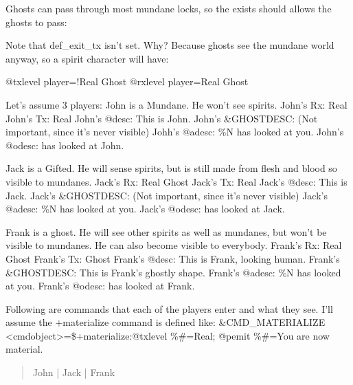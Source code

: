 \documentclass[letterpaper,10pt,english]{sphinxmanual}
\begin{document}
\begin{sphinxVerbatim}[commandchars=\\\{\}]
  
   
\end{sphinxVerbatim}

\sphinxAtStartPar
Ghosts can pass through most mundane locks, so the exists should allows the
ghosts to pass:

\begin{sphinxVerbatim}[commandchars=\\\{\}]
 
\end{sphinxVerbatim}

\sphinxAtStartPar
Note that def\_exit\_tx isn’t set. Why? Because ghosts see the mundane world
anyway, so a spirit character will have:

\begin{sphinxVerbatim}[commandchars=\\\{\}]
@txlevel \PYGZlt{}player\PYGZgt{}=!Real Ghost
@rxlevel \PYGZlt{}player\PYGZgt{}=Real Ghost
\end{sphinxVerbatim}

\sphinxAtStartPar
Let’s assume 3 players:
John is a Mundane. He won’t see spirits.
John’s Rx: Real
John’s Tx: Real
John’s @desc: This is John.
John’s \&GHOSTDESC: (Not important, since it’s never visible)
Johh’s @adesc: \%N has looked at you.
John’s @odesc: has looked at John.

\sphinxAtStartPar
Jack is a Gifted. He will sense spirits, but is still made from flesh
and blood so visible to mundanes.
Jack’s Rx: Real Ghost
Jack’s Tx: Real
Jack’s @desc: This is Jack.
Jack’s \&GHOSTDESC: (Not important, since it’s never visible)
Jack’s @adesc: \%N has looked at you.
Jack’s @odesc: has looked at Jack.

\sphinxAtStartPar
Frank is a ghost. He will see other spirits as well as mundanes, but won’t
be visible to mundanes. He can also become visible to everybody.
Frank’s Rx: Real Ghost
Frank’s Tx: Ghost
Frank’s @desc: This is Frank, looking human.
Frank’s \&GHOSTDESC: This is Frank’s ghostly shape.
Frank’s @adesc: \%N has looked at you.
Frank’s @odesc: has looked at Frank.

\sphinxAtStartPar
Following are commands that each of the players enter and what they see.
I’ll assume the +materialize command is defined like:
\&CMD\_MATERIALIZE \textless{}cmdobject\textgreater{}=\$+materialize:@txlevel \%\#=Real; @pemit \%\#=You
are now material.
\begin{quote}
\begin{description}
\item[{John            |         Jack          |         Frank}] \leavevmode
\begin{DUlineblock}{0em}
\item[] {\color{red}\bfseries{}|}
\end{DUlineblock}

\end{description}
\end{quote}
\end{document}
